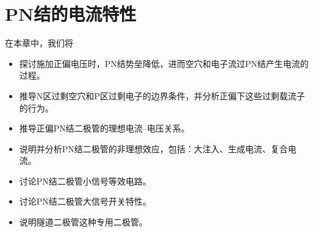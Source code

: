 \chapter{PN结的电流特性}
在本章中，我们将
\begin{itemize}
    \item 探讨施加正偏电压时，PN结势垒降低，进而空穴和电子流过PN结产生电流的过程。
    \item 推导N区过剩空穴和P区过剩电子的边界条件，并分析正偏下这些过剩载流子的行为。
    \item 推导正偏PN结二极管的理想电流--电压关系。
    \item 说明并分析PN结二极管的非理想效应，包括：大注入、生成电流、复合电流。
    \item 讨论PN结二极管小信号等效电路。
    \item 讨论PN结二极管大信号开关特性。
    \item 说明隧道二极管这种专用二极管。
\end{itemize}



